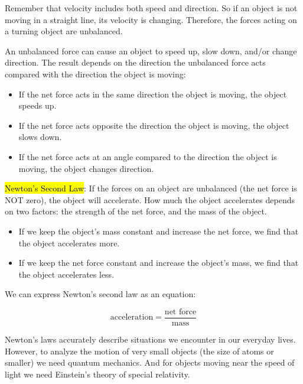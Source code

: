 Remember that velocity includes both speed and direction. So if an object is not moving in a straight line, its velocity is changing. Therefore, the forces acting on a turning object are unbalanced.

An unbalanced force can cause an object to speed up, slow down, and/or change direction. The result depends on the direction the unbalanced force acts compared with the direction the object is moving:

\begin{itemize}
  \item If the net force acts in the same direction the object is moving, the object speeds up.
  \item If the net force acts opposite the direction the object is moving, the object slows down.
  \item If the net force acts at an angle compared to the direction the object is moving, the object changes direction.
\end{itemize}

\vspace{.4cm}

\hl{Newton's Second Law}: If the forces on an object are unbalanced (the net force is NOT zero), the object will accelerate. How much the object accelerates depends on two factors: the strength of the net force, and the mass of the object.

\begin{itemize}
  \item If we keep the object's mass constant and increase the net force, we find that the object accelerates more.
  \item If we keep the net force constant and increase the object's mass, we find that the object accelerates less.
\end{itemize}

We can express Newton’s second law as an equation:

\begin{tcolorbox}[colback=red!5!white,colframe=red!75!black]
  \[\text{acceleration}=\frac{\text{net force}}{\text{mass}}\]
\end{tcolorbox}

Newton's laws accurately describe situations we encounter in our everyday lives. However, to analyze the motion of very small objects (the size of atoms or smaller) we need quantum mechanics. And for objects moving near the speed of light we need Einstein's theory of special relativity.
